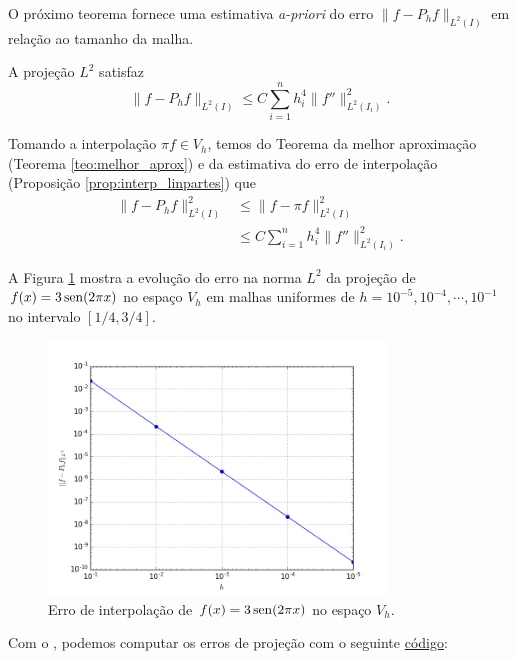 O próximo teorema fornece uma estimativa {\it a-priori} do erro $\|f-P_h f\|_{L^2(I)}$ em relação ao tamanho da malha.

\begin{teo}
  A projeção $L^2$ satisfaz
  \begin{equation}
    \|f-P_hf\|_{L^2(I)} \leq C\sum_{i=1}^n h_i^4\|f''\|_{L^2(I_i)}^2.
  \end{equation}
\end{teo}
\begin{dem}
  Tomando a interpolação $\pi f \in V_h$, temos do Teorema da melhor aproximação (Teorema \ref{teo:melhor_aprox}) e da estimativa do erro de interpolação (Proposição \ref{prop:interp_linpartes}) que
  \begin{align}
    \|f - P_hf\|_{L^2(I)}^2 &\leq \|f-\pi f\|_{L^2(I)}^2\\
    &\leq C\sum_{i=1}^n h_i^4\|f''\|_{L^2(I_i)}^2.
  \end{align}
\end{dem}

\begin{ex}\label{ex:esterro_proj}
  A Figura \ref{fig:ex_esterro_proj} mostra a evolução do erro na norma $L^2$ da projeção de $f(x)=3\operatorname{sen}(2\pi x)$ no espaço $V_h$ em malhas uniformes de $h=10^{-5}, 10^{-4}, \cdots, 10^{-1}$ no intervalo $[1/4, 3/4]$.

  \begin{figure}[h!]
    \centering
    \includegraphics[width=0.8\textwidth]{./cap_mef1d/dados/ex_esterro_proj/ex_esterro_proj}
    \caption{Erro de interpolação de $f(x)=3\operatorname{sen}(2\pi x)$ no espaço $V_h$.}
    \label{fig:ex_esterro_proj}
  \end{figure}

\ifispython
Com o \fenics, podemos computar os erros de projeção com o seguinte \href{https://github.com/phkonzen/notas/blob/master/src/MetodoElementosFinitos/cap_mef1d/dados/ex_esterro_proj/ex_esterro_proj.py}{código}:

\fi
\end{ex}

